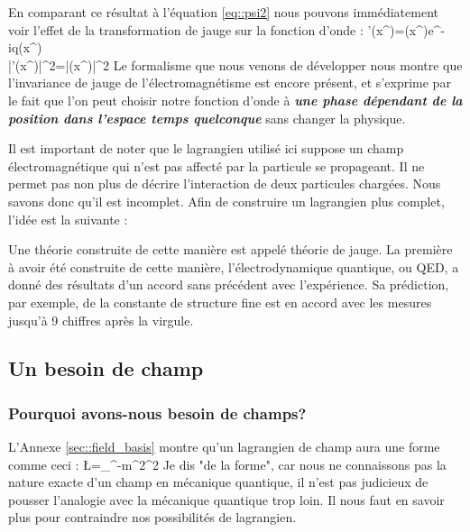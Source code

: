            \eeq
            En comparant ce résultat à l'équation \eqref{eq::psi2} nous pouvons immédiatement voir l'effet de la transformation de jauge sur la fonction d'onde : 
            \beq\label{eq::symu1}
                \psi'(x^{\mu})=\psi(x^{\mu})e^{-iq\chi(x^{\mu})} \nonumber \\
                |\psi'(x^{\mu})|^2=|\psi(x^{\mu})|^2
            \eeq
            Le formalisme que nous venons de développer nous montre que l'invariance de jauge de l'électromagnétisme est encore présent, et s'exprime par le fait que l'on peut choisir notre fonction d'onde à \textbf{\textit{une phase dépendant de la position dans l'espace temps quelconque}} sans changer la physique. 
            
            Il est important de noter que le lagrangien utilisé ici suppose un champ électromagnétique qui n'est pas affecté par la particule se propageant. Il ne permet pas non plus de décrire l'interaction de deux particules chargées. Nous savons donc qu'il est incomplet. Afin de construire un lagrangien plus complet, l'idée est la suivante : \\
            
            \begin{center}
            \par
            \end{center}
            
            Une théorie construite de cette manière est appelé théorie de jauge. La première à avoir été construite de cette manière, l'électrodynamique quantique, ou  QED, a donné des résultats d'un accord sans précédent avec l'expérience. Sa prédiction, par exemple, de la constante de structure fine est en accord avec les mesures jusqu'à 9 chiffres après la virgule\cite{harvard_article}. 
        
        \subsection{Un besoin de champ}
            \subsubsection{Pourquoi avons-nous besoin de champs?}    
                L'Annexe \ref{sec::field_basis} montre qu'un lagrangien de champ aura une forme comme ceci :
                \be 
                    \L=\partial_{\mu}\phi\partial^{\mu}\phi-m^2\phi^2
                \ee
                Je dis "de la forme", car nous ne connaissons pas la nature exacte d'un champ en mécanique quantique, il n'est pas judicieux de pousser l'analogie avec la mécanique quantique trop loin. Il nous faut en savoir plus pour contraindre nos possibilités de lagrangien.
            
